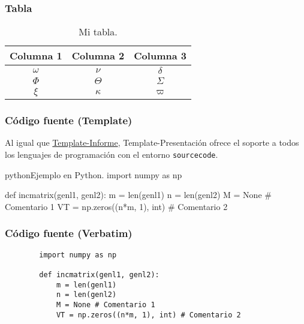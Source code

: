 
\begin{frame}
	\frametitle{Tabla}
	\begin{table}
		\centering
		\caption{Mi tabla.}
		\begin{tabular}{ccc}
			\hline
			\textbf{Columna 1} & \textbf{Columna 2} & \textbf{Columna 3} \bigstrut\\
			\hline
			$\omega$ & $\nu$ & $\delta$ \bigstrut[t]\\
			$\Phi$ & $\Theta$ & $\varSigma$ \\
			$\xi$ & $\kappa$ & $\varpi$ \bigstrut[b] \\
			\hline
		\end{tabular}
	\end{table}
\end{frame}


\begin{frame}[fragile]
	\frametitle{Código fuente (Template)}
	Al igual que \href{https://latex.ppizarror.com/informe}{Template-Informe}, Template-Presentación ofrece el soporte a todos los lenguajes de programación con el entorno \texttt{sourcecode}.
\begin{sourcecode}{python}{Ejemplo en Python.}
import numpy as np

def incmatrix(genl1, genl2):
	m = len(genl1)
	n = len(genl2)
	M = None # Comentario 1
	VT = np.zeros((n*m, 1), int) # Comentario 2
\end{sourcecode}
\end{frame}


\begin{frame}[fragile]
	\frametitle{Código fuente (Verbatim)}
	\begin{example}
		\begin{verbatim}
		import numpy as np

		def incmatrix(genl1, genl2):
			m = len(genl1)
			n = len(genl2)
			M = None # Comentario 1
			VT = np.zeros((n*m, 1), int) # Comentario 2
		\end{verbatim}
	\end{example}
\end{frame}


